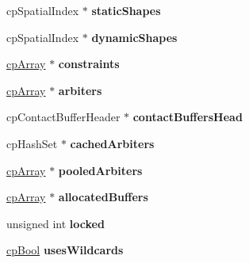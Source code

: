 \begin{DoxyCompactItemize}
\item 
\hypertarget{structcp_space_a117edb83ef6a85c86bc5bbf0f09b33f4}{}cp\+Spatial\+Index $\ast$ {\bfseries static\+Shapes}\label{structcp_space_a117edb83ef6a85c86bc5bbf0f09b33f4}

\item 
\hypertarget{structcp_space_abcfaf140db337502b99e075e012eb009}{}cp\+Spatial\+Index $\ast$ {\bfseries dynamic\+Shapes}\label{structcp_space_abcfaf140db337502b99e075e012eb009}

\item 
\hypertarget{structcp_space_ae22a0f11a7957a5a23acc287a265246c}{}\hyperlink{structcp_array}{cp\+Array} $\ast$ {\bfseries constraints}\label{structcp_space_ae22a0f11a7957a5a23acc287a265246c}

\item 
\hypertarget{structcp_space_adaef45459e5d96f9006a2d19a383fd28}{}\hyperlink{structcp_array}{cp\+Array} $\ast$ {\bfseries arbiters}\label{structcp_space_adaef45459e5d96f9006a2d19a383fd28}

\item 
\hypertarget{structcp_space_a985b08764b2aa665110b81cc4b53c4d7}{}cp\+Contact\+Buffer\+Header $\ast$ {\bfseries contact\+Buffers\+Head}\label{structcp_space_a985b08764b2aa665110b81cc4b53c4d7}

\item 
\hypertarget{structcp_space_a99818a31e7e3b840e1e7eed93ed7051f}{}cp\+Hash\+Set $\ast$ {\bfseries cached\+Arbiters}\label{structcp_space_a99818a31e7e3b840e1e7eed93ed7051f}

\item 
\hypertarget{structcp_space_ad4b497d160bf4c400e8504b53f494591}{}\hyperlink{structcp_array}{cp\+Array} $\ast$ {\bfseries pooled\+Arbiters}\label{structcp_space_ad4b497d160bf4c400e8504b53f494591}

\item 
\hypertarget{structcp_space_a04092f5b2f4b06263d09919ec0ba28c9}{}\hyperlink{structcp_array}{cp\+Array} $\ast$ {\bfseries allocated\+Buffers}\label{structcp_space_a04092f5b2f4b06263d09919ec0ba28c9}

\item 
\hypertarget{structcp_space_aad32581cd9bac9f485e4910e8a2256e9}{}unsigned int {\bfseries locked}\label{structcp_space_aad32581cd9bac9f485e4910e8a2256e9}

\item 
\hypertarget{structcp_space_af91f836d9c1614ea43ba9ac507535be9}{}\hyperlink{group__basic_types_gabc5e752c48f3449ca26ef413ecbd647e}{cp\+Bool} {\bfseries uses\+Wildcards}\label{structcp_space_af91f836d9c1614ea43ba9ac507535be9}


\end{DoxyCompactItemize}
